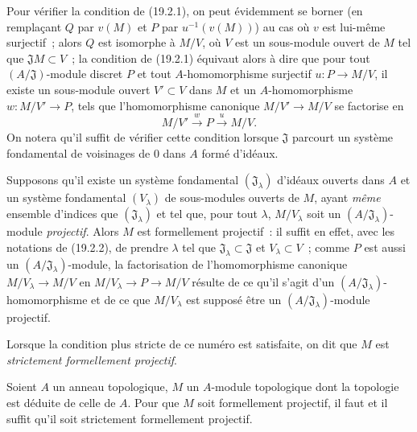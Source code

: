 \begin{env}[19.2.2]
\label{0.19.2.2-fr}
Pour vérifier la condition de (19.2.1), on peut évidemment se borner (en
remplaçant $Q$ par $v(M)$ et $P$ par $u^{-1}(v(M))$) au cas où $v$ est
lui-même surjectif~; alors $Q$ est isomorphe à $M/V$, où $V$ est un
sous-module ouvert de $M$ tel que $\mathfrak JM\subset V$~; la condition de
(19.2.1) équivaut alors à dire que pour tout $(A/\mathfrak J)$-module discret
$P$ et tout $A$-homomorphisme surjectif $u:P\to M/V$, il existe un sous-module
ouvert $V'\subset V$ dans $M$ et un $A$-homomorphisme $w:M/V'\to P$, tels que
l'homomorphisme canonique $M/V'\to M/V$ se factorise en
\[
  M/V'\xrightarrow{w}P\xrightarrow{u}M/V.
\]
On notera qu'il suffit de vérifier cette condition lorsque $\mathfrak J$
parcourt un système fondamental de voisinages de 0 dans $A$ formé d'idéaux.
\end{env}

\begin{env}[19.2.3]
\label{0.19.2.3-fr}
Supposons qu'il existe un système fondamental $(\mathfrak J_\lambda)$ d'idéaux
ouverts dans $A$ et un système fondamental $(V_\lambda)$ de sous-modules
ouverts de $M$, ayant \emph{même} ensemble d'indices que
$(\mathfrak J_\lambda)$ et tel que, pour tout $\lambda$, $M/V_\lambda$ soit un
$(A/\mathfrak J_\lambda)$-module \emph{projectif}. Alors $M$ est formellement
projectif~: il suffit en effet, avec les notations de (19.2.2), de prendre
$\lambda$ tel que $\mathfrak J_\lambda\subset\mathfrak J$ et
$V_\lambda\subset V$~; comme $P$ est aussi un
$(A/\mathfrak J_\lambda)$-module, la factorisation de l'homomorphisme canonique
$M/V_\lambda\to M/V$ en $M/V_\lambda\to P\to M/V$ résulte de ce qu'il s'agit
d'un $(A/\mathfrak J_\lambda)$-homomorphisme et de ce que $M/V_\lambda$ est
supposé être un $(A/\mathfrak J_\lambda)$-module projectif.

Lorsque la condition plus stricte de ce numéro est satisfaite, on dit que $M$
est \emph{strictement formellement projectif}.
\end{env}

\begin{proposition}[19.2.4]
\label{0.19.2.4-fr}
Soient $A$ un anneau topologique, $M$ un $A$-module topologique dont la
topologie est déduite de celle de $A$. Pour que $M$ soit formellement
projectif, il faut et il suffit qu'il soit strictement formellement projectif.
\end{proposition}


